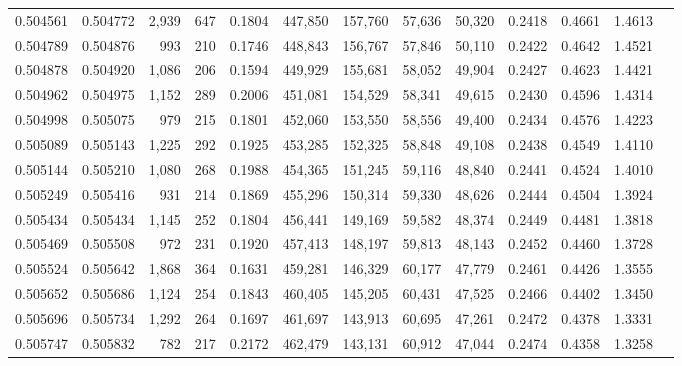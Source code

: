 \begin{tabular}{rrrrrrrrrrrrr}
0.504561 & 0.504772 &  2,939 &   647 &                                     0.1804 & 447,850 & 157,760 &  57,636 &  50,320 & 0.2418 & 0.4661 & 1.4613 \\
0.504789 & 0.504876 &    993 &   210 &                                     0.1746 & 448,843 & 156,767 &  57,846 &  50,110 & 0.2422 & 0.4642 & 1.4521 \\
0.504878 & 0.504920 &  1,086 &   206 &                                     0.1594 & 449,929 & 155,681 &  58,052 &  49,904 & 0.2427 & 0.4623 & 1.4421 \\
0.504962 & 0.504975 &  1,152 &   289 &                                     0.2006 & 451,081 & 154,529 &  58,341 &  49,615 & 0.2430 & 0.4596 & 1.4314 \\
0.504998 & 0.505075 &    979 &   215 &                                     0.1801 & 452,060 & 153,550 &  58,556 &  49,400 & 0.2434 & 0.4576 & 1.4223 \\
0.505089 & 0.505143 &  1,225 &   292 &                                     0.1925 & 453,285 & 152,325 &  58,848 &  49,108 & 0.2438 & 0.4549 & 1.4110 \\
0.505144 & 0.505210 &  1,080 &   268 &                                     0.1988 & 454,365 & 151,245 &  59,116 &  48,840 & 0.2441 & 0.4524 & 1.4010 \\
0.505249 & 0.505416 &    931 &   214 &                                     0.1869 & 455,296 & 150,314 &  59,330 &  48,626 & 0.2444 & 0.4504 & 1.3924 \\
0.505434 & 0.505434 &  1,145 &   252 &                                     0.1804 & 456,441 & 149,169 &  59,582 &  48,374 & 0.2449 & 0.4481 & 1.3818 \\
0.505469 & 0.505508 &    972 &   231 &                                     0.1920 & 457,413 & 148,197 &  59,813 &  48,143 & 0.2452 & 0.4460 & 1.3728 \\
0.505524 & 0.505642 &  1,868 &   364 &                                     0.1631 & 459,281 & 146,329 &  60,177 &  47,779 & 0.2461 & 0.4426 & 1.3555 \\
0.505652 & 0.505686 &  1,124 &   254 &                                     0.1843 & 460,405 & 145,205 &  60,431 &  47,525 & 0.2466 & 0.4402 & 1.3450 \\
0.505696 & 0.505734 &  1,292 &   264 &                                     0.1697 & 461,697 & 143,913 &  60,695 &  47,261 & 0.2472 & 0.4378 & 1.3331 \\
0.505747 & 0.505832 &    782 &   217 &                                     0.2172 & 462,479 & 143,131 &  60,912 &  47,044 & 0.2474 & 0.4358 & 1.3258 \\

\end{tabular}

